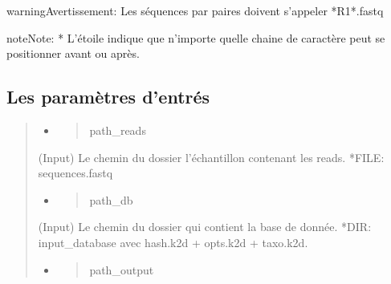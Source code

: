 \documentclass[letterpaper,10pt,french]{sphinxmanual}
\begin{document}
\begin{sphinxadmonition}{warning}{Avertissement:}
Les séquences par paires doivent s’appeler *R1*.fastq
\end{sphinxadmonition}

\begin{sphinxadmonition}{note}{Note:}
* L’étoile indique que n’importe quelle chaine de caractère peut se positionner avant ou après.
\end{sphinxadmonition}


\subsection{Les paramètres d’entrés}
\label{\detokenize{bash/classify_set_sequences.sh:les-parametres-d-entres}}\begin{quote}
\begin{itemize}
\item {} \begin{quote}\begin{description}
\item[{\sphinxhyphen{}path\_reads}] \leavevmode
\end{description}\end{quote}

\end{itemize}

(Input)  Le chemin du dossier l’échantillon contenant les reads.                 *FILE: sequences.fastq
\begin{itemize}
\item {} \begin{quote}\begin{description}
\item[{\sphinxhyphen{}path\_db}] \leavevmode
\end{description}\end{quote}

\end{itemize}

(Input)  Le chemin du dossier qui contient la base de donnée.
*DIR: input\_database avec hash.k2d + opts.k2d + taxo.k2d.
\begin{itemize}
\item {} \begin{quote}\begin{description}
\item[{\sphinxhyphen{}path\_output}] \leavevmode
\end{description}\end{quote}


\end{itemize}
\end{quote}
\end{document}
